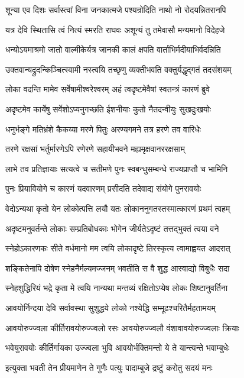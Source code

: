 \twolineshloka
{शून्या एव दिशः सर्वास्त्वां विना जनकात्मजे}
{पश्यन्रोदिति नाथो नो रोदयन्नितरानपि}%

\twolineshloka
{यत्र देवि स्थितासि त्वं नित्यं स्मरति राघवः}
{अशून्यं तु तमेवासौ मन्यमानो विदेहजे}%

\twolineshloka
{धन्योऽयमाश्रमो जातो वाल्मीकेर्यत्र जानकी}
{कालं क्षपति वार्ताभिर्मदीयाभिर्वदन्निति}%

\twolineshloka
{उक्तवान्यद्रुदन्किञ्चित्स्वामी नस्त्वयि तच्छृणु}
{व्यक्तीभवति वक्तुर्यद्धृद्गतं तदसंशयम्}%

\twolineshloka
{लोका वदन्ति मामेव सर्वेषामीश्वरेश्वरम्}
{अहं त्वदृष्टमेवैषां स्वतन्त्रं कारणं ब्रुवे}%

\twolineshloka
{अदृष्टमेव कार्येषु सर्वेशोऽप्यनुगच्छति}
{ईशनीयाः कुतो नैतदन्वीयुः सुखदुःखयोः}%

\twolineshloka
{धनुर्भङ्गे मतिभ्रंशे कैकय्या मरणे पितुः}
{अरण्यगमने तत्र हरणे तव वारिधेः}%

\twolineshloka
{तरणे रक्षसां भर्तुर्मारणेऽपि रणेरणे}
{सहायीभवने मह्यमृक्षवानररक्षसाम्}%

\twolineshloka
{लाभे तव प्रतिज्ञायाः सत्यत्वे च सतीमणे}
{पुनः स्वबन्धुसम्बन्धे राज्यप्राप्तौ च भामिनि}%

\twolineshloka
{पुनः प्रियावियोगे च कारणं यदवारणम्}
{प्रसीदति तदेवाद्य संयोगे पुनरावयोः}%

\twolineshloka
{वेदोऽन्यथा कृतो येन लोकोत्पत्ति लयौ यतः}
{लोकाननुगतस्तस्मात्कारणं प्रथमं त्वहम्}%

\twolineshloka
{अदृष्टमनुवर्तन्ते लोकाः सम्प्रतिबोधकाः}
{भोगेन जीर्यतेऽदृष्टं तत्तद्भुक्तं त्वया वने}%

\twolineshloka
{स्नेहोऽकारणकः सीते वर्धमानो मम त्वयि}
{लोकादृष्टे तिरस्कृत्य त्वामाह्वयत आदरात्}%

\twolineshloka
{शङ्कितेनापि दोषेण स्नेहनैर्मल्यमज्जनम्}
{भवतीति स वै शुद्ध आस्वाद्यो विबुधैः सदा}%

\twolineshloka
{स्नेहशुद्धिरियं भद्रे कृता मे त्वयि नान्यथा}
{मन्तव्यं रक्षितोऽप्येष लोकः शिष्टानुवर्तिना}%

\twolineshloka
{आवयोर्निन्दया देवि सर्वावस्था सुशुद्धये}
{लोको नश्येद्धि सम्मूढश्चरितैर्महतामयम्}%

\twolineshloka
{आवयोरुज्ज्वला कीर्तिरावयोरुज्ज्वलो रसः}
{आवयोरुज्ज्वलौ वंशावावयोरुज्ज्वलाः क्रियाः}%

\twolineshloka
{भवेयुरावयोः कीर्तिर्गायका उज्ज्वला भुवि}
{आवयोर्भक्तिमन्तो ये ते यान्त्यन्ते भवाम्बुधेः}%

\twolineshloka
{इत्युक्ता भवती तेन प्रीयमाणेन ते गुणैः}
{पत्युः पादाम्बुजे द्रष्टुं करोतु सदयं मनः}%

